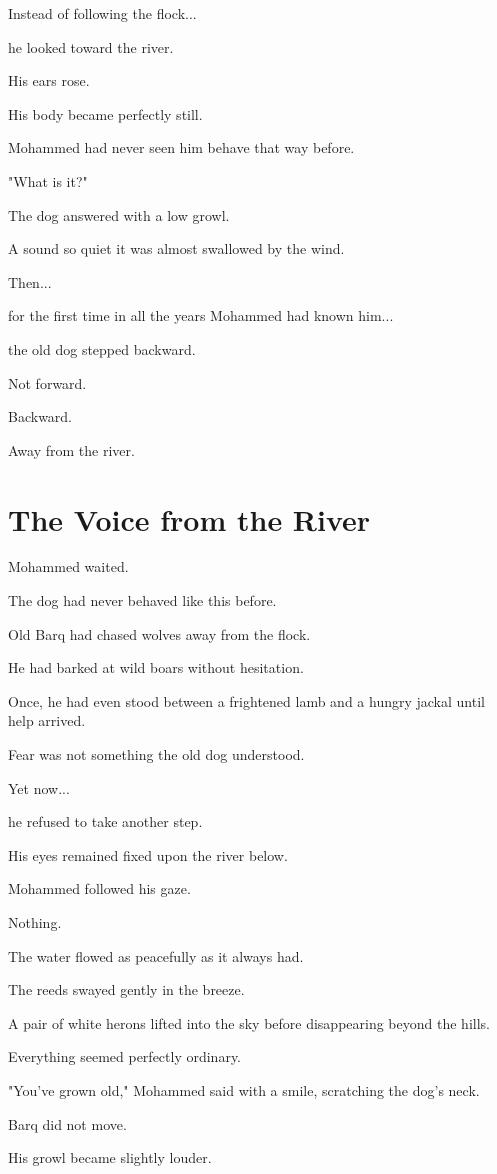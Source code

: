 \documentclass[12pt,openany]{book}
\begin{document}
Instead of following the flock...

he looked toward the river.

His ears rose.

His body became perfectly still.

Mohammed had never seen him behave that way before.

"What is it?"

The dog answered with a low growl.

A sound so quiet it was almost swallowed by the wind.

Then...

for the first time in all the years Mohammed had known him...

the old dog stepped backward.

Not forward.

Backward.

Away from the river.
\section*{The Voice from the River}

Mohammed waited.

The dog had never behaved like this before.

Old Barq had chased wolves away from the flock.

He had barked at wild boars without hesitation.

Once, he had even stood between a frightened lamb and a hungry jackal until help arrived.

Fear was not something the old dog understood.

Yet now...

he refused to take another step.

His eyes remained fixed upon the river below.

Mohammed followed his gaze.

Nothing.

The water flowed as peacefully as it always had.

The reeds swayed gently in the breeze.

A pair of white herons lifted into the sky before disappearing beyond the hills.

Everything seemed perfectly ordinary.

"You've grown old," Mohammed said with a smile, scratching the dog's neck.

Barq did not move.

His growl became slightly louder.
\end{document}
